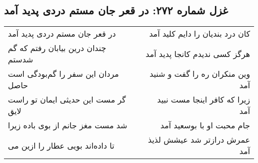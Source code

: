 \begin{center}
\section*{غزل شماره ۲۷۲: در قعر جان مستم دردی پدید آمد}
\label{sec:272}
\begin{longtable}{l p{0.5cm} r}
در قعر جان مستم دردی پدید آمد
&&
کان درد بندیان را دایم کلید آمد
\\
چندان درین بیابان رفتم که گم شدستم
&&
هرگز کسی ندیدم کانجا پدید آمد
\\
مردان این سفر را گم‌بودگی است حاصل
&&
وین منکران ره را گفت و شنید آمد
\\
گر مست این حدیثی ایمان تو راست لایق
&&
زیرا که کافر اینجا مست نبید آمد
\\
شد مست مغز جانم از بوی باده زیرا
&&
جام محبت او با بوسعید آمد
\\
تا داده‌اند بویی عطار را ازین می
&&
عمرش درازتر شد عیشش لذیذ آمد
\\
\end{longtable}
\end{center}
